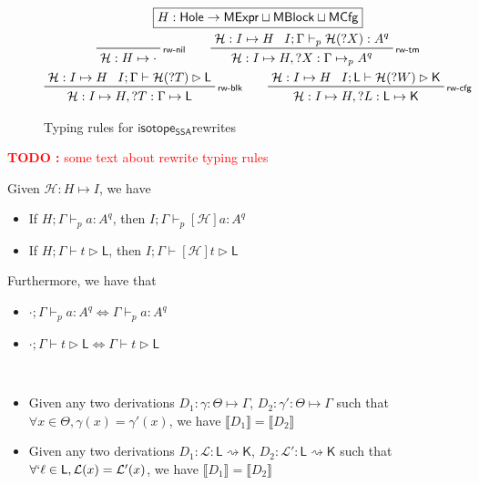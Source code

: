 \documentclass[acmsmall,screen,review]{acmart}
\newcounter{todos}
\newcommand{\TODO}[1]{{
  \stepcounter{todos}
  \begin{center}\large{\textcolor{red}{\textbf{TODO \arabic{todos}:} #1}}\end{center}
}}
\newcommand{\mc}[1]{\ensuremath{\mathcal{#1}}}
\newcommand{\ms}[1]{\ensuremath{\mathsf{#1}}}
\newcommand{\lbl}[1]{{`#1}}
\newcommand{\rle}[1]{{\scriptsize\textsf{#1}}}
\newcommand{\hasty}[5]{#1 \vdash_{#2} #3: {#4}^{#5}}
\newcommand{\haslb}[3]{#1 \vdash #2 \rhd #3}
\newcommand{\issubst}[3]{#1: #2 \mapsto #3}
\newcommand{\lbsubst}[3]{#1: #2 \rightsquigarrow #3}
\newcommand{\lhole}[1]{?#1}
\newcommand{\mhasty}[6]{#1;#2 \vdash_{#3} #4: {#5}^{#6}}
\newcommand{\mhaslb}[4]{#1;#2 \vdash #3 \rhd #4}
\newcommand{\mlhaslb}[4]{#1;#2 \vdash #3 \rhd #4}
\newcommand{\tyhole}[5]{#1: #2 \mapsto_{#3} {#4}^{#5}}
\newcommand{\blkhole}[3]{#1: #2 \mapsto #3}
\newcommand{\cfghole}[3]{#1: #2 \mapsto #3}
\newcommand{\isrw}[3]{#1: #2 \mapsto #3}
\newcommand{\dnt}[1]{\llbracket{#1}\rrbracket}
\newcommand{\isotopessa}{\ms{isotope_{SSA}}}
\begin{document}
\begin{figure}
  \begin{gather*}
    \boxed{H: \ms{Hole} \to \ms{MExpr} \sqcup \ms{MBlock} \sqcup \ms{MCfg}}
    \\
    \prftree[r]{\rle{rw-nil}}
      {\isrw{\mc{H}}{H}{\cdot}}
    \qquad
    \prftree[r]{\rle{rw-tm}}
      {\isrw{\mc{H}}{I}{H}}
      {\mhasty{I}{\Gamma}{p}{\mc{H}(\lhole{X})}{A}{q}}
      {\isrw{\mc{H}}{I}{H, \tyhole{\lhole{X}}{\Gamma}{p}{A}{q}}}
    \\
    \prftree[r]{\rle{rw-blk}}
      {\isrw{\mc{H}}{I}{H}}
      {\mhaslb{I}{\Gamma}{\mc{H}(\lhole{T})}{\ms{L}}}
      {\isrw{\mc{H}}{I}{H, \blkhole{\lhole{T}}{\Gamma}{\ms{L}}}}
    \qquad
    \prftree[r]{\rle{rw-cfg}}
      {\isrw{\mc{H}}{I}{H}}
      {\mlhaslb{I}{\ms{L}}{\mc{H}(\lhole{W})}{\ms{K}}}
      {\isrw{\mc{H}}{I}{H, \cfghole{\lhole{L}}{\ms{L}}{\ms{K}}}}
  \end{gather*}
  \caption{Typing rules for \isotopessa rewrites}
  \label{fig:rewrite-typing}
\end{figure}

\TODO{some text about rewrite typing rules}

\begin{theorem}[Rewriting]
  Given \(\isrw{\mc{H}}{H}{I}\), we have
  \begin{itemize}
    \item If \(\mhasty{H}{\Gamma}{p}{a}{A}{q}\), then \(\mhasty{I}{\Gamma}{p}{[\mc{H}]a}{A}{q}\)
    \item If \(\mhaslb{H}{\Gamma}{t}{\ms{L}}\), then \(\mhaslb{I}{\Gamma}{[\mc{H}]t}{\ms{L}}\)
  \end{itemize}
  
  Furthermore, we have that 
  \begin{itemize}
    \item \(\mhasty{\cdot}{\Gamma}{p}{a}{A}{q} \iff \hasty{\Gamma}{p}{a}{A}{q}\)
    \item \(\mhaslb{\cdot}{\Gamma}{t}{\ms{L}} \iff \haslb{\Gamma}{t}{\ms{L}}\)
  \end{itemize}
\end{theorem}

\begin{lemma} \
  \begin{itemize}
    \item Given any two derivations \(D_1: \issubst{\gamma}{\Theta}{\Gamma}\), \(D_2: \issubst{\gamma'}{\Theta}{\Gamma}\) such that \(\forall x \in \Theta, \gamma(x) = \gamma'(x)\), we have \(\dnt{D_1} = \dnt{D_2}\)
    \item Given any two derivations \(D_1: \lbsubst{\mc{L}}{\ms{L}}{\ms{K}}\), \(D_2: \lbsubst{\mc{L}'}{\ms{L}}{\ms{K}}\) such that \(\forall \lbl{\ell} \in \ms{L}, \mc{L}(x) = \mc{L}'(x)\), we have \(\dnt{D_1} = \dnt{D_2}\)
  \end{itemize}
\end{lemma}
\end{document}

